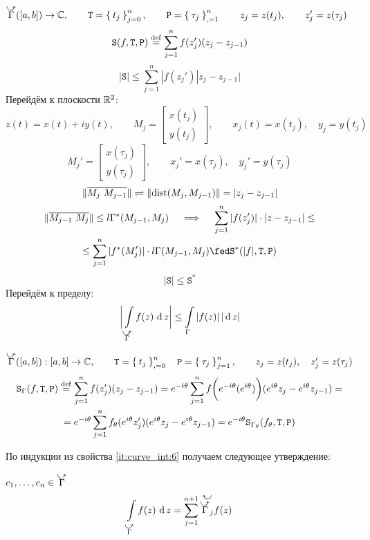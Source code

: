 \begin{eproof}
	\item $ \curvedir\Gamma ([a, b]) \to \Co, \qquad \mathtt T = \seqz[n]{t_j}j, \qquad \mathtt P = \seq[n]{\tau_j}, \qquad z_j = z(t_j), \qquad z_j' = z(\tau_j) $
		$$ \mathtt S (f, \mathtt T, \mathtt P) \stackrel{\operatorname{def}}{=} \sum_{j = 1}^n f(z_j')(z_j - z_{j - 1}) $$
		$$ |\mathtt S| \le \sum_{j = 1}^n |f(z_j') |z_j - z_{j - 1}| $$
		Перейдём к плоскости $ \mathbb{R}^2 $:
		$$ z(t) = x(t) + iy(t), \qquad M_j =
		\begin{bmatrix}
			x(t_j) \\
			y(t_j)
		\end{bmatrix}, \qquad x_j(t) = x(t_j), \quad y_j = y(t_j) $$
		$$ M_j' =
		\begin{bmatrix}
			x(\tau_j) \\
			y(\tau_j)
		\end{bmatrix}, \qquad x_j' = x(\tau_j), \quad y_j' = y(\tau_j) $$
		$$ \| \overline{M_j ~ M_{j - 1}} \| \rightleftharpoons \left\|{\operatorname{dist}(M_j, M_{j - 1})}\right\| = |z_j - z_{j - 1}| $$
		\begin{multline*}
			\| \ol{M_{j - 1} ~ M_{j}} \| \le l \Gamma^*(M_{j - 1}, M_j) \quad \implies \quad \sum_{j = 1}^n |f(z_j')| \cdot |z - z_{j - 1}| \le \\
			\le \sum_{j = 1}^n |f^*(M_j')| \cdot l \Gamma(M_{j - 1}, M_j) \fed \mathtt S^*(|f|, \mathtt T, \mathtt P)
		\end{multline*}
		$$ |\mathtt S| \le \mathtt S^* $$
		Перейдём к пределу:
		$$ \bigg| \cint[z]{\curvedir\Gamma}{f(z)} \bigg| \le \acint\Gamma{|f(z)|} $$

	\item $ \curvedir\Gamma ([a, b]) : [a, b] \to \Co, \qquad \mathtt T = \seqz[n]{t_j}, \quad \mathtt P = \seq[n]{\tau_j}j, \qquad z_j = z(t_j), \quad z_j' = z(\tau_j) $
		\begin{multline*}
			\mathtt S_\Gamma(f, \mathtt T, \mathtt P) \stackrel{\operatorname{def}}{=} \sum_{j = 1}^n f(z_j')(z_j - z_{j - 1}) = e^{-i\theta} \sum_{j = 1}^n f \bigg( e^{-i\theta}(e^{i\theta}) \bigg) (e^{i\theta}z_j - e^{i\theta}z_{j - 1}) = \\
			= e^{-i\theta} \sum_{j = 1}^n f_\theta(e^{i\theta}z_j')(e^{i\theta}z_j - e^{i\theta}z_{j - 1}) = e^{-i\theta} \mathtt S_{\Gamma_\theta}(f_\theta, \mathtt T, \mathtt P)
		\end{multline*}
\end{eproof}

По индукции из свойства \ref{it:curve_int:6} получаем следующее утверждение:

\begin{property}
	$ c_1, \dots, c_n \in \curvedir\Gamma $
	$$ \cint[z]{\curvedir\Gamma}{f(z)} = \sum_{j = 1}^{n + 1} \curvedir[z]{\curvedir\Gamma_j}{f(z)} $$
\end{property}

